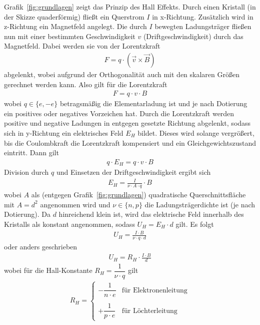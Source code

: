 \documentclass{article}
\begin{document}
Grafik~\ref{fig:grundlagen} zeigt das Prinzip des Hall Effekts. Durch einen Kristall (in der Skizze quaderförmig) fließt ein Querstrom $I$ in x-Richtung. Zusätzlich wird in z-Richtung ein Magnetfeld angelegt. Die durch $I$ bewegten Ladungsträger fließen nun mit einer bestimmten Geschwindigkeit $v$ (Driftgeschwindigkeit) durch das Magnetfeld. Dabei werden sie von der Lorentzkraft
\begin{align*}
F = q\cdot (\vec{v} \times \vec{B})
\end{align*}
abgelenkt, wobei aufgrund der Orthogonalität auch mit den skalaren Größen gerechnet werden kann. Also gilt für die Lorentzkraft
\begin{align*}
F = q\cdot v\cdot B
\end{align*}
wobei $q \in\{e,-e\}$ betragsmäßig die Elementarladung ist und je nach Dotierung ein positives oder negatives Vorzeichen hat. Durch die Lorentzkraft werden positive und negative Ladungen in entgegen gesetzte Richtung abgelenkt, sodass sich in y-Richtung ein elektrisches Feld $E_H$ bildet. Dieses wird solange vergrößert, bis die Coulombkraft die Lorentzkraft kompensiert und ein Gleichgewichtszustand eintritt. Dann gilt
\begin{align*}
q\cdot E_H = q\cdot v \cdot B
\end{align*}
Division durch $q$ und Einsetzen der Driftgeschwindigkeit ergibt sich
\begin{align*}
E_H = \frac{I}{\nu\cdot A\cdot q} \cdot B
\end{align*}
wobei $A$ als (entgegen Grafik~\ref{fig:grundlagen}) quadratische Querschnittsfläche mit $A=d^2$ angenommen wird und $\nu \in \{n,p\}$ die Ladungsträgerdichte ist (je nach Dotierung). Da $d$ hinreichend klein ist, wird das elektrische Feld innerhalb des Kristalls als konstant angenommen, sodass $U_H = E_H\cdot d$ gilt. Es folgt
\begin{align*}
U_H = \frac{I\cdot B}{\nu \cdot q \cdot d}
\end{align*}
oder anders geschrieben
\begin{align}
U_H = R_H \cdot \frac{I\cdot B}{d}
\label{eq:hall}
\end{align}
wobei für die Hall-Konstante $R_H = \dfrac{1}{\nu\cdot q}$ gilt
\begin{align*}
R_H = \begin{cases} -\dfrac{1}{n\cdot e} & \text{für Elektronenleitung} \\ 
& \\
 +\dfrac{1}{p\cdot e} & \text{für Löchterleitung} \end{cases}
\end{align*}
\end{document}
